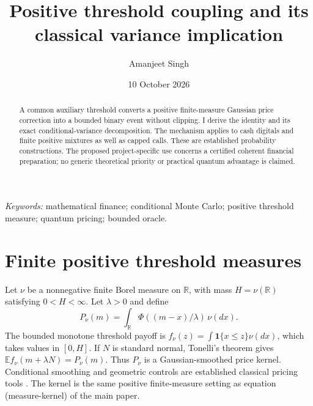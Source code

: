 \documentclass[11pt,a4paper]{article}
\title{Positive threshold coupling and its classical variance implication}
\author{Amanjeet Singh}
\date{10 October 2026}
\newcommand{\E}{\mathbb E}
\newcommand{\ind}{\mathbf 1}
\begin{document}
\maketitle
\begin{abstract}
A common auxiliary threshold converts a positive finite-measure Gaussian
price correction into a bounded binary event without clipping. I derive the
identity and its exact conditional-variance decomposition. The mechanism
applies to cash digitals and finite positive mixtures as well as capped
calls. These are established probability constructions. The proposed
project-specific use concerns a certified coherent financial preparation;
no generic theoretical priority or practical quantum advantage is claimed.
\end{abstract}
\noindent\textit{Keywords:} mathematical finance; conditional Monte Carlo;
positive threshold measure; quantum pricing; bounded oracle.

\section{Finite positive threshold measures}
Let $\nu$ be a nonnegative finite Borel measure on $\mathbb R$, with mass
$H=\nu(\mathbb R)$ satisfying $0<H<\infty$. Let $\lambda>0$ and define
\[
 P_\nu(m)=\int_{\mathbb R}\Phi((m-x)/\lambda)\,\nu(dx).
\]
The bounded monotone threshold payoff is
$f_\nu(z)=\int\ind\{x\le z\}\nu(dx)$, which takes values in $[0,H]$.
If $N$ is standard normal, Tonelli's theorem gives
$\E f_\nu(m+\lambda N)=P_\nu(m)$. Thus $P_\nu$ is a Gaussian-smoothed
price kernel. Conditional smoothing and geometric controls are established
classical pricing tools \citep{curran,bayer}. The kernel is the same positive
finite-measure setting as equation (measure-kernel) of the main paper.
\end{document}

